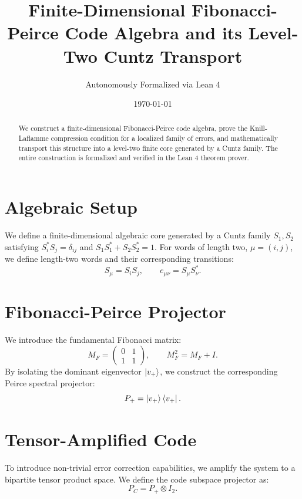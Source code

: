 \documentclass[11pt,a4paper]{article}
\title{Finite-Dimensional Fibonacci-Peirce Code Algebra and its Level-Two Cuntz Transport}
\author{Autonomously Formalized via Lean 4}
\date{\today}
\begin{document}
\maketitle

\begin{abstract}
We construct a finite-dimensional Fibonacci-Peirce code algebra, prove the Knill-Laflamme compression condition for a localized family of errors, and mathematically transport this structure into a level-two finite core generated by a Cuntz family. The entire construction is formalized and verified in the Lean 4 theorem prover.
\end{abstract}

\section{Algebraic Setup}
We define a finite-dimensional algebraic core generated by a Cuntz family $S_1, S_2$ satisfying $S_i^* S_j = \delta_{ij}$ and $S_1S_1^* + S_2S_2^* = 1$. For words of length two, $\mu = (i,j)$, we define length-two words and their corresponding transitions:
\begin{equation}
S_\mu = S_i S_j, \qquad e_{\mu\nu} = S_\mu S_\nu^*.
\end{equation}

\section{Fibonacci-Peirce Projector}
We introduce the fundamental Fibonacci matrix:
\begin{equation}
M_F =
\begin{pmatrix}
0 & 1 \\
1 & 1
\end{pmatrix}, \qquad M_F^2 = M_F + I.
\end{equation}
By isolating the dominant eigenvector $\ket{v_+}$, we construct the corresponding Peirce spectral projector:
\begin{equation}
P_+ = \ket{v_+}\bra{v_+}.
\end{equation}

\section{Tensor-Amplified Code}
To introduce non-trivial error correction capabilities, we amplify the system to a bipartite tensor product space. We define the code subspace projector as:
\begin{equation}
P_C = P_+ \otimes I_2.
\end{equation}
\end{document}
